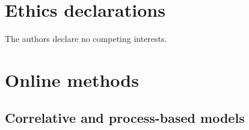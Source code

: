 \documentclass[pdflatex, sn-nature]{sn-jnl}%
\begin{document}
\section*{Ethics declarations}

The authors declare no competing interests.





\section{Online methods}\label{methods}

\subsection{Correlative and process-based models}\label{models}
\end{document}
